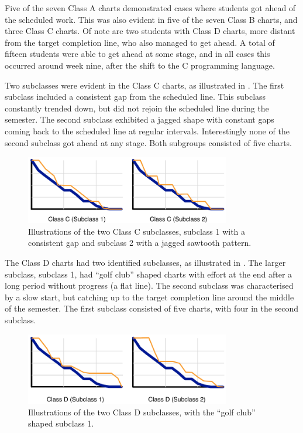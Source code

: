 
Five of the seven Class A charts demonstrated cases where students got ahead of the scheduled work. This was also evident in five of the seven Class B charts, and three Class C charts. Of note are two students with Class D charts, more distant from the target completion line, who also managed to get ahead. A total of fifteen students were able to get ahead at some stage, and in all cases this occurred around week nine, after the shift to the C programming language. 

Two subclasses were evident in the Class C charts, as illustrated in . The first subclass included a consistent gap from the scheduled line. This subclass constantly trended down, but did not rejoin the scheduled line during the semester. The second subclass exhibited a jagged shape with constant gaps coming back to the scheduled line at regular intervals. Interestingly none of the second subclass got ahead at any stage. Both subgroups consisted of five charts.

\begin{figure}[htbp]
  \centering
  \includegraphics[width=0.8\textwidth]{ChartCSubclass}
  \caption{Illustrations of the two Class C subclasses, subclass 1 with a consistent gap and subclass 2 with a jagged sawtooth pattern.}
  \label{fig:c_subclass}
\end{figure}

The Class D charts had two identified subclasses, as illustrated in . The larger subclass, subclass 1, had ``golf club'' shaped charts with effort at the end after a long period without progress (a flat line). The second subclass was characterised by a slow start, but catching up to the target completion line around the middle of the semester. The first subclass consisted of five charts, with four in the second subclass.

\begin{figure}[htbp]
  \centering
  \includegraphics[width=0.8\textwidth]{ChartDSubclass}
  \caption{Illustrations of the two Class D subclasses, with the ``golf club'' shaped subclass 1.}
  \label{fig:d_subclass}
\end{figure}

